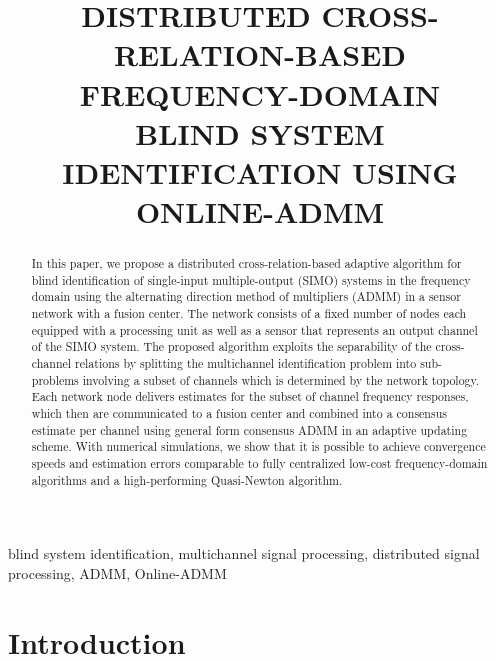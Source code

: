 \documentclass{article}
\title{DISTRIBUTED CROSS-RELATION-BASED FREQUENCY-DOMAIN\\ BLIND SYSTEM IDENTIFICATION USING ONLINE-ADMM}
\begin{document}
%
\maketitle
%
\begin{abstract}
    In this paper, we propose a distributed cross-relation-based adaptive algorithm for blind identification of single-input multiple-output (SIMO) systems in the frequency domain using the alternating direction method of multipliers (ADMM) in a sensor network with a fusion center.
    The network consists of a fixed number of nodes each equipped with a processing unit as well as a sensor that represents an output channel of the SIMO system.
    The proposed algorithm exploits the separability of the cross-channel relations by splitting the multichannel identification problem into sub-problems involving a subset of channels which is determined by the network topology.
    Each network node delivers estimates for the subset of channel frequency responses, which then are communicated to a fusion center and combined into a consensus estimate per channel using general form consensus ADMM in an adaptive updating scheme.
    With numerical simulations, we show that it is possible to achieve convergence speeds and estimation errors comparable to fully centralized low-cost frequency-domain algorithms and a high-performing Quasi-Newton algorithm.
\end{abstract}
%
\begin{keywords}
    blind system identification, multichannel signal processing, distributed signal processing, ADMM, Online-ADMM
\end{keywords}
%
\section{Introduction}
\label{sec:intro}
\end{document}
